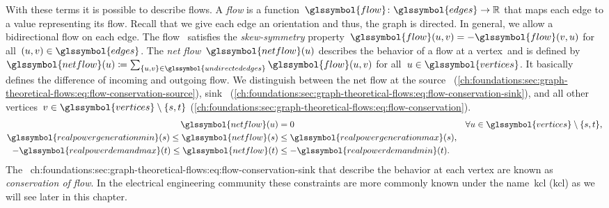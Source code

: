 With these terms it is possible to describe flows. A \emph{flow} is a
function~$\glssymbol{flow}\colon\glssymbol{edges}\to\reals$ that maps each edge
to a value representing its flow. Recall that we give each edge an orientation
and thus, the graph is directed. In general, we allow a bidirectional flow on
each edge. The flow~ satisfies the \emph{skew-symmetry}
property~$
\glssymbol{flow}(\vertexa,\vertexb) = - \glssymbol{flow}(\vertexb,\vertexa)$ for all~$
(\vertexa,\vertexb)\in\glssymbol{edges}$. The \emph{net
flow}~$\glssymbol{netflow}(\vertexa)$ describes the behavior of a flow at a
vertex~\vertexa and is defined by~$\glssymbol{netflow}(\vertexa)\coloneqq\sum_{
\{\vertexa,\vertexb\}\in\glssymbol{undirectededges}}\glssymbol{flow}(\vertexa,\vertexb)$ for
all~$\vertexa\in\glssymbol{vertices}$. It basically defines the difference of
incoming and outgoing flow. We distinguish between the net flow at the
source~\source
(\cref{ch:foundations:sec:graph-theoretical-flows:eq:flow-conservation-source}),
sink~\sink
(\cref{ch:foundations:sec:graph-theoretical-flows:eq:flow-conservation-sink}),
and all other
vertices~$\vertex\in\glssymbol{vertices}\setminus\{\source,\sink\}$
(\cref{ch:foundations:sec:graph-theoretical-flows:eq:flow-conservation}).
% 
\begin{align}%
    \glssymbol{netflow}(\vertexa) &= 0
    &\forall\vertexa\in\glssymbol{vertices}\setminus\{\source, \sink\},
    \label{ch:foundations:sec:graph-theoretical-flows:eq:flow-conservation}%
    \\%
    \glssymbol{realpowergenerationmin}(\source)\leq\glssymbol{netflow}
    (\source)&\leq\glssymbol{realpowergenerationmax}(\source),
    \label{ch:foundations:sec:graph-theoretical-flows:eq:flow-conservation-source}%
    \\%
    -\glssymbol{realpowerdemandmax}(\sink)\leq\glssymbol{netflow}(\sink)&\leq
    -\glssymbol{realpowerdemandmin}(\sink).
    \label{ch:foundations:sec:graph-theoretical-flows:eq:flow-conservation-sink}%
\end{align}%
% 
The~
{ch:foundations:sec:graph-theoretical-flows:eq:flow-conservation-sink} that
describe the behavior at each vertex are known as \emph{conservation of flow}.
In the electrical engineering community these constraints are more commonly
known under the name~\acrlong{kcl} (\acrshort{kcl}) as we will see later in this
chapter.

